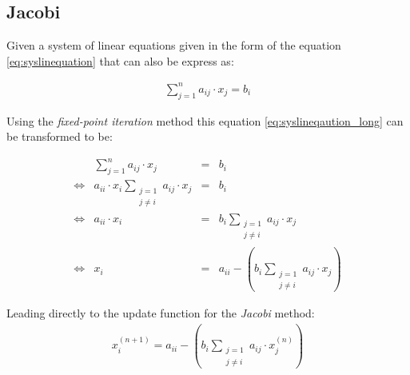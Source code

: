 \subsection{Jacobi} \label{jacobi}
Given a system of linear equations given in the form of the equation \eqref{eq:syslinequation} that can also be express as:

\begin{equation}\label{eq:syslineqaution_long}
	\begin{array}{lcl}
		\displaystyle\sum_{j=1}^{n} a_{ij} \cdot x_j = b_i
	\end{array}
\end{equation}

Using the \textit{fixed-point iteration} method this equation \eqref{eq:syslineqaution_long} can be transformed to be:

\begin{equation}\label{eq:syslineqaution_fixedpoint}
	\begin{array}{lrcl}
		&\displaystyle\sum_{j=1}^{n} a_{ij} \cdot x_j &=& b_i\\
        \Leftrightarrow & a_{ii} \cdot x_i \displaystyle\sum_{\substack{j=1 \\ j\neq i}} a_{ij} \cdot x_j &=& b_i\\
        \Leftrightarrow & a_{ii} \cdot x_i  &=& b_i \displaystyle\sum_{\substack{j=1 \\ j\neq i}} a_{ij} \cdot x_j\\
        \Leftrightarrow & x_i  &=& a_{ii} - (b_i \displaystyle\sum_{\substack{j=1 \\ j\neq i}} a_{ij} \cdot x_j)
	\end{array}
\end{equation}

Leading directly to the update function for the \textit{Jacobi} method:
\begin{equation}\label{eq:jacobi_update}
	\begin{array}{lrcl}
		x_i^{(n+1)}  = a_{ii} - (b_i \displaystyle\sum_{\substack{j=1 \\ j\neq i}} a_{ij} \cdot x_j^{(n)})
	\end{array}
\end{equation}
























